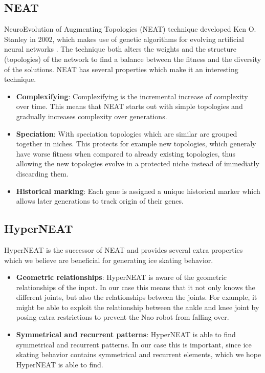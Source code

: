 \documentclass[10pt]{article}
\begin{document}
\subsection{NEAT}
NeuroEvolution of Augmenting Topologies (NEAT) technique developed Ken O. Stanley in 2002, which makes use of genetic algorithms for evolving artificial neural networks \cite{wikipedia:neat}. The technique both alters the weights and the structure (topologies) of the network to find a balance between the fitness and the diversity of the solutions. NEAT has several properties which make it an interesting technique.

\begin{itemize}
	\item \textbf{Complexifying}: Complexifying is the incremental increase of complexity over time. This means that NEAT starts out with simple topologies and gradually increases complexity over generations.
	\item \textbf{Speciation}: With speciation topologies which are similar are grouped together in niches. This protects for example new topologies, which generaly have worse fitness when compared to already existing topologies, thus allowing the new topologies evolve in a protected niche instead of immediatly discarding them.
	\item \textbf{Historical marking}: Each gene is assigned a unique historical marker which allows later generations to track origin of their genes.  
\end{itemize}

\subsection{HyperNEAT}
HyperNEAT is the successor of NEAT and provides several extra properties which we believe are beneficial for generating ice skating behavior.

\begin{itemize}
	\item \textbf{Geometric relationships}: HyperNEAT is aware of the geometric relationships of the input. In our case this means that it not only knows the different joints, but also the relationships between the joints. For example, it might be able to exploit the relationship between the ankle and knee joint by posing extra restrictions to prevent the Nao robot from falling over.
	\item \textbf{Symmetrical and recurrent patterns}: HyperNEAT is able to find symmetrical and recurrent patterns. In our case this is important, since ice skating behavior contains symmetrical and recurrent elements, which we hope HyperNEAT is able to find.
\end{itemize}
\end{document}

